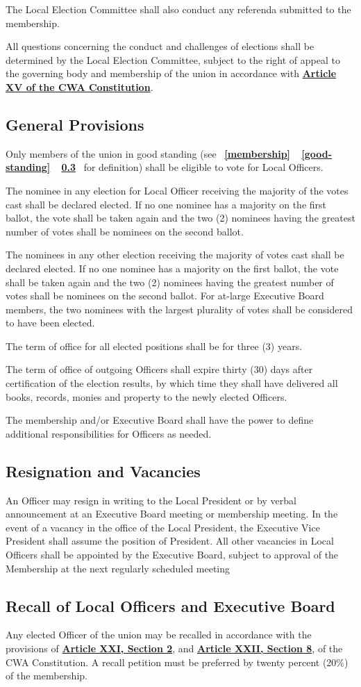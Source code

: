 \documentclass[11pt]{article}
\let\oldhref\href
\renewcommand{\href}[2]{\oldhref{#1}{\bfseries#2}}
\newcommand{\articlesection}[1]{\vspace{.25cm}\subsection{#1}}
\newcommand{\fullref}[3]{%
  \mbox{\textbf{%
    \ifthenelse{\isempty{#1}}%
    {}%
    {\ref{#1}}%
    \ifthenelse{\isempty{#2}}%
    {}%
    {%
      \ifthenelse{\isempty{#1}}{}{, }%
      \ref{#2}%
    }%
    \ifthenelse{\isempty{#3}}%
    {}%
    {\ref{#3}}%
  }}%
}
\begin{document}
The Local Election Committee shall also conduct any referenda submitted to the membership.

All questions concerning the conduct and challenges of elections shall be determined by the Local Election Committee, subject to the right of appeal to the governing body and membership of the union in accordance with \href{https://cwa-union.org/for-locals/cwa-constitution\#A15}{Article XV of the CWA Constitution}.

\articlesection{General Provisions}
Only members of the union in good standing (see \fullref{membership}{good-standing}{} for definition) shall be eligible to vote for Local Officers.

The nominee in any election for Local Officer receiving the majority of the votes cast shall be declared elected. If no one nominee has a majority on the first ballot, the vote shall be taken again and the two (2) nominees having the greatest number of votes shall be nominees on the second ballot.

The nominees in any other election receiving the majority of votes cast shall be declared elected. If no one nominee has a majority on the first ballot, the vote shall be taken again and the two (2) nominees having the greatest number of votes shall be nominees on the second ballot. For at-large Executive Board members, the two nominees with the largest plurality of votes shall be considered to have been elected.

The term of office for all elected positions shall be for three (3) years.

The term of office of outgoing Officers shall expire thirty (30) days after certification of the election results, by which time they shall have delivered all books, records, monies and property to the newly elected Officers.

The membership and/or Executive Board shall have the power to define additional responsibilities for Officers as needed.

\articlesection{Resignation and Vacancies}
An Officer may resign in writing to the Local President or by verbal announcement at an Executive Board meeting or membership meeting. In the event of a vacancy in the office of the Local President, the Executive Vice President shall assume the position of President. All other vacancies in Local Officers shall be appointed by the Executive Board, subject to approval of the Membership at the next regularly scheduled meeting

\articlesection{Recall of Local Officers and Executive Board}
Any elected Officer of the union may be recalled in accordance with the provisions of \href{https://cwa-union.org/for-locals/cwa-constitution\#A21}{Article XXI, Section 2}, and \href{https://cwa-union.org/for-locals/cwa-constitution\#A22}{Article XXII, Section 8}, of the CWA Constitution. A recall petition must be preferred by twenty percent (20\%) of the membership.
\end{document}
